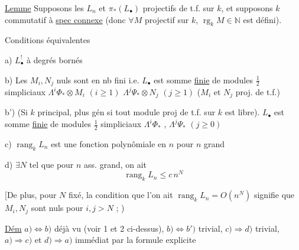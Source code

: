 \uline{Lemme} Supposons les $L_n$ et $\pi_*(L_{\bullet})$ projectifs de t.f. sur $k$, et supposons $k$ commutatif à \uline{spec connexe} (donc $\forall M$ projectif sur $k$, $\operatorname{rg}_k M\in\mathbb N$ est défini).

Conditions équivalentes

a) $L_{\bullet}^{!}$ à degrés bornés

b)  Les $M_i,N_j$  nuls sont en nb fini i.e. $L_{\bullet}$ est \inserted{$\simeq$} somme \uline{finie} de modules $\frac12$ simpliciaux $\Lambda^i\Phi_*\otimes M_i$ $(i\geq1)$ $\Lambda^j\Psi_*\otimes N_j$ $(j\geq1)$ ($M_i$ et $N_j$ proj. de t.f.)

b') (Si $k$ principal, plus gén si tout module proj de t.f. sur $k$ est libre). $L_{\bullet}$ est \inserted{$\simeq$} somme \uline{finie} de modules $\frac12$ simpliciaux $\Lambda^i\Phi_*$ , $\Lambda^j\Psi_*$ $(j\geq0)$

c) $\operatorname{rang}_k L_n$ est une fonction polynômiale en $n$ pour $n$ grand

d) $\exists N$  tel que pour $n$ ass. grand, on ait
\[
\operatorname{rang}_k L_n\leq c\,n^N
\]

 [De plus,  pour $N$ fixé, la condition que l'on ait $\operatorname{rang}_k L_n=O(n^N)$ signifie que $M_i,N_j$ sont nuls pour $i,j>N$ ; )

\uline{Dém}  $a)\Longleftrightarrow b)$ déjà vu (voir 1 et 2 ci-dessus), $b)\Longleftrightarrow b')$ trivial,  $c)\Longrightarrow d)$ trivial, $a)\Longrightarrow c)$ et $d)\Longrightarrow a)$ immédiat par la formule explicite
